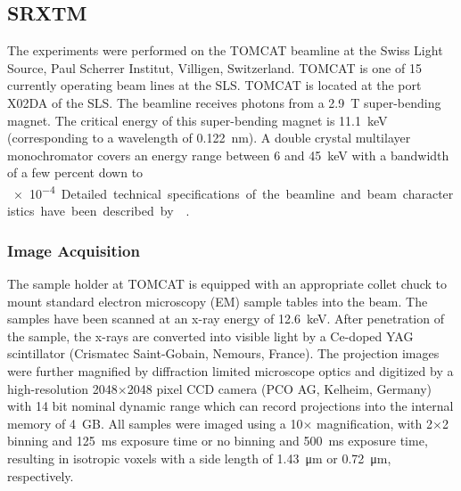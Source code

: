 \subsection{SRXTM}
The experiments were performed on the TOMCAT beamline at the Swiss Light Source, Paul Scherrer Institut, Villigen, Switzerland. TOMCAT is one of 15 currently operating beam lines at the SLS. TOMCAT is located at the port X02DA of the SLS. The beamline receives photons from a \SI{2.9}{\tesla} super-bending magnet. The critical energy of this super-bending magnet is \SI{11.1}{\kilo\electronvolt} (corresponding to a wavelength of \SI{0.122}{\nano\meter}). A double crystal multilayer monochromator covers an energy range between 6 and \SI{45}{\kilo\electronvolt} with a bandwidth of a few percent down to \SI{e-4}. Detailed technical specifications of the beamline and beam characteristics have been described by~\citeauthor{Stampanoni2006a}~\cite{Stampanoni2006a,Stampanoni2007}.

\subsubsection{Image Acquisition}
\label{seq:Image Acquisition}
The sample holder at TOMCAT is equipped with an appropriate collet chuck to mount standard electron microscopy (EM) sample tables into the beam. The samples have been scanned at an x-ray energy of \SI{12.6}{\kilo\electronvolt}. After penetration of the sample, the x-rays are converted into visible light by a Ce-doped YAG scintillator (Crismatec Saint-Gobain, Nemours, France). The projection images were further magnified by diffraction limited microscope optics and digitized by a high-resolution 2048$\times$2048 pixel CCD camera (PCO AG, Kelheim, Germany) with 14 bit nominal dynamic range which can record projections into the internal memory of \SI{4}{\giga B}. All samples were imaged using a 10$\times$ magnification, with 2$\times$2 binning and \SI{125}{\milli\second} exposure time or no binning and \SI{500}{\milli\second} exposure time, resulting in isotropic voxels with a side length of \SI{1.43}{\micro\meter} or \SI{0.72}{\micro\meter}, respectively.

